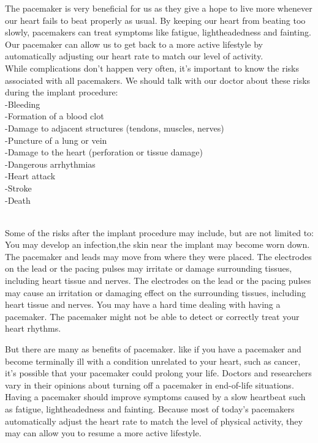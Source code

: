 \documentclass[12pt]{article}
\begin{document}
The pacemaker is very beneficial for us as they give a hope to live more whenever our heart fails to beat properly as usual.
By keeping our heart from beating too slowly, pacemakers can treat symptoms like fatigue, lightheadedness and fainting. Our pacemaker can allow us to get back to a more active lifestyle by automatically adjusting our heart rate to match our level of activity.
\\

While complications don’t happen very often, it’s important to know the risks associated with all pacemakers. 
We should talk with our doctor about these risks during the implant procedure:
\\
-Bleeding
\\
-Formation of a blood clot
\\
-Damage to adjacent structures (tendons, muscles, nerves)
\\
-Puncture of a lung or vein
\\
-Damage to the heart (perforation or tissue damage)
\\
-Dangerous arrhythmias
\\
-Heart attack
\\
-Stroke
\\
-Death

\\
Some of the risks after the implant procedure may include, but are not limited to:
\\
You may develop an infection,the skin near the implant may become worn down. The pacemaker and leads may move from where they were placed.
The electrodes on the lead or the pacing pulses may irritate or damage surrounding tissues, including heart tissue and nerves. The electrodes on the lead or the pacing pulses may cause an irritation or damaging effect on the surrounding tissues, including heart tissue and nerves.
You may have a hard time dealing with having a pacemaker.
The pacemaker might not be able to detect or correctly treat your heart rhythms.

\indent

But there are many as benefits of pacemaker. like if you have a pacemaker and become terminally ill with a condition unrelated to your heart, such as cancer, it's possible that your pacemaker could prolong your life. Doctors and researchers vary in their opinions about turning off a pacemaker in end-of-life situations.
Having a pacemaker should improve symptoms caused by a slow heartbeat such as fatigue, lightheadedness and fainting. Because most of today's pacemakers automatically adjust the heart rate to match the level of physical activity, they may can allow you to resume a more active lifestyle.
\end{document}
